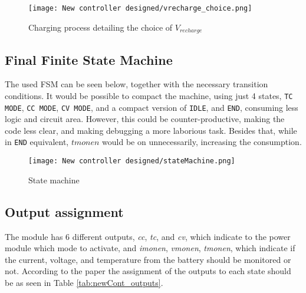 \documentclass[12pt]{article}
\begin{document}
\begin{figure}[H]
    \centering 
    \texttt{[image: New controller designed/vrecharge\_choice.png]}
    \caption{Charging process detailing the choice of $V_{recharge}$}
    \label{fig:vrecharge}
\end{figure}

\subsection{Final Finite State Machine}

The used FSM can be seen below, together with the necessary transition conditions. It would be possible to compact the machine, using just 4 states, \texttt{TC MODE}, \texttt{CC MODE}, \texttt{CV MODE}, and a compact version of \texttt{IDLE}, and \texttt{END}, consuming less logic and circuit area. However, this could be counter-productive, making the code less clear, and making debugging a more laborious task. Besides that, while in \texttt{END} equivalent, $tmonen$ would be on unnecessarily, increasing the consumption.  

\begin{figure}[H]
    \centering
    \texttt{[image: New controller designed/stateMachine.png]}
    \caption{State machine}
    \label{fig:state_machine}
\end{figure}


\subsection{Output assignment}
The module has 6 different outputs, \textit{cc}, \textit{tc}, and \textit{cv}, which indicate to the power module which mode to activate, and \textit{imonen}, \textit{vmonen}, \textit{tmonen}, which indicate if the current, voltage, and temperature from the battery should be monitored or not. According to the paper the assignment of the outputs to each state should be as seen in Table \ref{tab:newCont_outputs}.  
\end{document}
